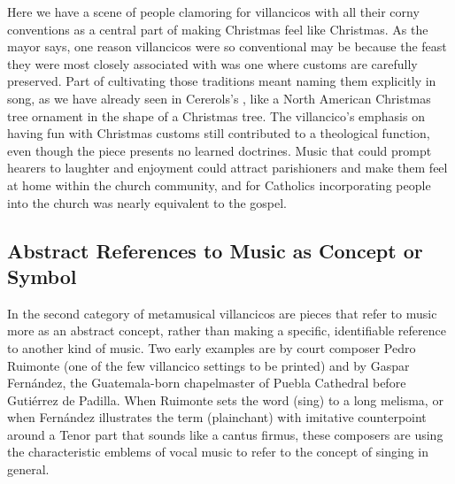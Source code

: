 Here we have a scene of people clamoring for villancicos with all their corny
conventions as a central part of making Christmas feel like Christmas.
As the mayor says, one reason villancicos were so conventional may be because
the feast they were most closely associated with was one where customs are
carefully preserved.
Part of cultivating those traditions meant naming them explicitly in song, as we
have already seen in Cererols's , like a
North American Christmas tree ornament in the shape of a Christmas tree.
The villancico's emphasis on having fun with Christmas customs still
contributed to a theological function, even though the piece presents no
learned doctrines.%
    \Autocite[161--185]{Illari:Polychoral}
Music that could prompt hearers to laughter and enjoyment could attract
parishioners and make them feel at home within the church community, and for
Catholics incorporating people into the church was nearly equivalent to the
gospel.


\subsection{Abstract References to Music as Concept or Symbol}

In the second category of metamusical villancicos are pieces that refer to
music more as an abstract concept, rather than making a specific, identifiable
reference to another kind of music.
Two early examples are  by court composer Pedro
Ruimonte (one of the few villancico settings to be printed) and  by Gaspar Fernández, the Guatemala-born chapelmaster of
Puebla Cathedral before Gutiérrez de Padilla.%
    \Autocites
    {Ruimonte:Parnaso}
    {Fernandez:Cancionero}
    [for crucial emendations to the latter composer's biography, see][]
    {Morales:Fernandez}
When Ruimonte sets the word  (sing) to a long melisma, or when
Fernández illustrates the term  (plainchant) with
imitative counterpoint around a Tenor part that sounds like a cantus firmus,
these composers are using the characteristic emblems of vocal music to refer to
the concept of singing in general.


